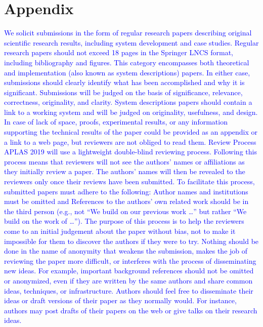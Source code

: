 \documentclass[runningheads]{llncs}
\newcommand{\blue}[1]{\textcolor{blue}{#1 }}
\begin{document}
  \section{Appendix}

  \blue{We solicit submissions in the form of regular research papers describing original scientific research results, including system development and case studies. Regular research papers should not exceed 18 pages in the Springer LNCS format, including bibliography and figures. This category encompasses both theoretical and implementation (also known as system descriptions) papers. In either case, submissions should clearly identify what has been accomplished and why it is significant. Submissions will be judged on the basis of significance, relevance, correctness, originality, and clarity. System descriptions papers should contain a link to a working system and will be judged on originality, usefulness, and design. In case of lack of space, proofs, experimental results, or any information supporting the technical results of the paper could be provided as an appendix or a link to a web page, but reviewers are not obliged to read them.}
  \blue{Review Process
      APLAS 2019 will use a lightweight double-blind reviewing process. Following this process means that reviewers will not see the authors’ names or affiliations as they initially review a paper. The authors’ names will then be revealed to the reviewers only once their reviews have been submitted.
      To facilitate this process, submitted papers must adhere to the following:
      Author names and institutions must be omitted and
      References to the authors’ own related work should be in the third person (e.g., not “We build on our previous work …” but rather “We build on the work of …”).
  The purpose of this process is to help the reviewers come to an initial judgement about the paper without bias, not to make it impossible for them to discover the authors if they were to try. Nothing should be done in the name of anonymity that weakens the submission, makes the job of reviewing the paper more difficult, or interferes with the process of disseminating new ideas. For example, important background references should not be omitted or anonymized, even if they are written by the same authors and share common ideas, techniques, or infrastructure. Authors should feel free to disseminate their ideas or draft versions of their paper as they normally would. For instance, authors may post drafts of their papers on the web or give talks on their research ideas.}
  
\end{document}
